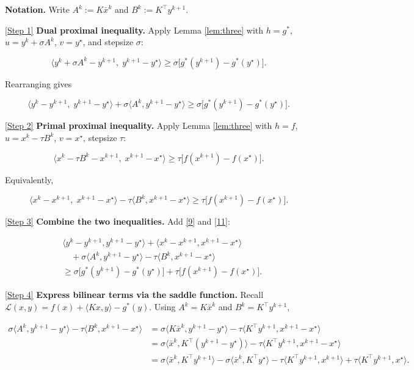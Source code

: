 \documentclass{article}
\begin{document}
\noindent\textbf{Notation.} Write $A^{k}:=K\bar x^{k}$ and $B^{k}:=K^{\!\top}y^{k+1}$.

\noindent\underline{[Step 1]} \textbf{Dual proximal inequality.}  
Apply Lemma \ref{lem:three} with $h=g^{*}$, $u=y^{k}+ \sigma A^{k}$, $v=y^{\star}$, and stepsize $\sigma$:

\[
\langle y^{k}+ \sigma A^{k}-y^{k+1},\; y^{k+1}-y^{\star}\rangle
\ge \sigma\bigl[g^{*}(y^{k+1})-g^{*}(y^{\star})\bigr].
\tag{8}
\]

Rearranging gives  

\[
\langle y^{k}-y^{k+1},\; y^{k+1}-y^{\star}\rangle
+ \sigma\langle A^{k}, y^{k+1}-y^{\star}\rangle
\ge \sigma\bigl[g^{*}(y^{k+1})-g^{*}(y^{\star})\bigr].
\tag{9}
\]

\noindent\underline{[Step 2]} \textbf{Primal proximal inequality.}  
Apply Lemma \ref{lem:three} with $h=f$, $u=x^{k}-\tau B^{k}$, $v=x^{\star}$, stepsize $\tau$:

\[
\langle x^{k}-\tau B^{k}-x^{k+1},\; x^{k+1}-x^{\star}\rangle
\ge \tau\bigl[f(x^{k+1})-f(x^{\star})\bigr].
\tag{10}
\]

Equivalently,

\[
\langle x^{k}-x^{k+1},\; x^{k+1}-x^{\star}\rangle
-\tau\langle B^{k},x^{k+1}-x^{\star}\rangle
\ge \tau\bigl[f(x^{k+1})-f(x^{\star})\bigr].
\tag{11}
\]

\noindent\underline{[Step 3]} \textbf{Combine the two inequalities.}  
Add \eqref{9} and \eqref{11}:

\[
\begin{aligned}
&\langle y^{k}-y^{k+1},y^{k+1}-y^{\star}\rangle
+\langle x^{k}-x^{k+1},x^{k+1}-x^{\star}\rangle \\
&\quad +\sigma\langle A^{k},y^{k+1}-y^{\star}\rangle
-\tau\langle B^{k},x^{k+1}-x^{\star}\rangle \\
&\ge \sigma\bigl[g^{*}(y^{k+1})-g^{*}(y^{\star})\bigr]
   +\tau\bigl[f(x^{k+1})-f(x^{\star})\bigr].
\end{aligned}
\tag{12}
\]

\noindent\underline{[Step 4]} \textbf{Express bilinear terms via the saddle function.}  
Recall $\mathcal L(x,y)=f(x)+\langle Kx,y\rangle-g^{*}(y)$.  Using $A^{k}=K\bar x^{k}$ and $B^{k}=K^{\!\top}y^{k+1}$,

\[
\begin{aligned}
\sigma\langle A^{k},y^{k+1}-y^{\star}\rangle
-\tau\langle B^{k},x^{k+1}-x^{\star}\rangle
&=\sigma\langle K\bar x^{k},y^{k+1}-y^{\star}\rangle
   -\tau\langle K^{\!\top}y^{k+1},x^{k+1}-x^{\star}\rangle\\
&= \sigma\langle \bar x^{k},K^{\!\top}(y^{k+1}-y^{\star})\rangle
   -\tau\langle K^{\!\top}y^{k+1},x^{k+1}-x^{\star}\rangle\\
&= \sigma\langle \bar x^{k},K^{\!\top}y^{k+1}\rangle
   -\sigma\langle \bar x^{k},K^{\!\top}y^{\star}\rangle
   -\tau\langle K^{\!\top}y^{k+1},x^{k+1}\rangle
   +\tau\langle K^{\!\top}y^{k+1},x^{\star}\rangle .
\end{aligned}
\tag{13}
\]
\end{document}

